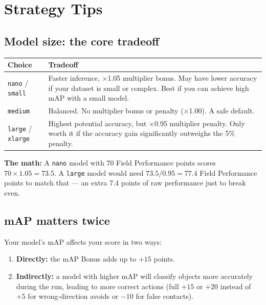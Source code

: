 \documentclass[a4]{article}
\begin{document}
\pagebreak
\section*{Strategy Tips}

\subsection*{Model size: the core tradeoff}

\begin{table}[H]
\centering
\begin{tabular}{lp{10cm}}
\toprule
\textbf{Choice} & \textbf{Tradeoff} \\
\midrule
\texttt{nano} / \texttt{small} & Faster inference, $\times$1.05 multiplier bonus. May have lower accuracy if your dataset is small or complex. Best if you can achieve high mAP with a small model. \\
\addlinespace
\texttt{medium} & Balanced. No multiplier bonus or penalty ($\times$1.00). A safe default. \\
\addlinespace
\texttt{large} / \texttt{xlarge} & Highest potential accuracy, but $\times$0.95 multiplier penalty. Only worth it if the accuracy gain significantly outweighs the 5\% penalty. \\
\bottomrule
\end{tabular}
\end{table}

\textbf{The math:} A \texttt{nano} model with 70 Field Performance points scores $70 \times 1.05 = 73.5$. A \texttt{large} model would need $73.5 / 0.95 = 77.4$ Field Performance points to match that --- an extra 7.4 points of raw performance just to break even.

\subsection*{mAP matters twice}

Your model's mAP affects your score in two ways:
\begin{enumerate}
    \item \textbf{Directly:} the mAP Bonus adds up to $+15$ points.
    \item \textbf{Indirectly:} a model with higher mAP will classify objects more accurately during the run, leading to more correct actions (full $+15$ or $+20$ instead of $+5$ for wrong-direction avoids or $-10$ for false contacts).
\end{enumerate}
\end{document}
